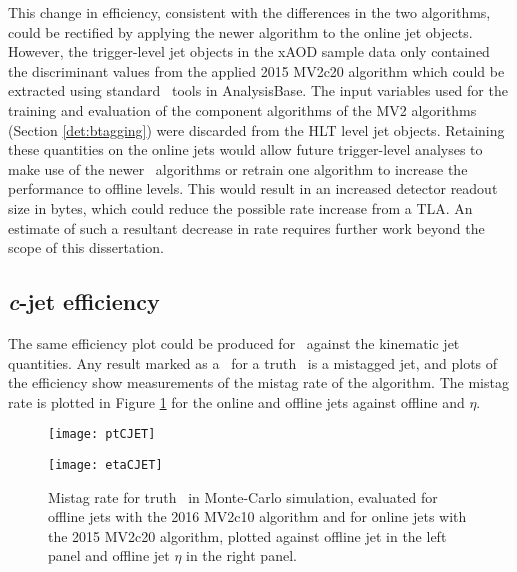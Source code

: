 		This change in efficiency, consistent with the differences in the two algorithms, could be rectified by applying the newer algorithm to the online jet objects. However, the trigger-level jet objects in the xAOD sample data only contained the discriminant values from the applied 2015 MV2c20 algorithm which could be extracted using standard \btag\ tools in AnalysisBase. The input variables used for the training and evaluation of the component algorithms of the MV2 algorithms (Section \ref{det:btagging}) were discarded from the HLT level jet objects. Retaining these quantities on the online jets would allow future trigger-level analyses to make use of the newer \btag\ algorithms or retrain one algorithm to increase the performance to offline levels. This would result in an increased detector readout size in bytes, which could reduce the possible rate increase from a TLA. An estimate of such a resultant decrease in rate requires further work beyond the scope of this dissertation.

	\subsection{\textit{c}-jet efficiency}
	The same efficiency plot could be produced for \cjets\, against the kinematic jet quantities. Any result marked as a \bjet\ for a truth \cjet\ is a mistagged jet, and plots of the efficiency show measurements of the mistag rate of the algorithm. The mistag rate is plotted in Figure \ref{fig:MC:cjetefficiency} for the online and offline jets against offline \pt and $\eta$.
		\begin{figure}[h]
			\centering
			\begin{minipage}[h]{0.48\linewidth}
				\texttt{[image: ptCJET]}

			\end{minipage}
			\quad
			\begin{minipage}[h]{0.48\linewidth}
				\texttt{[image: etaCJET]}
			\end{minipage}
			\caption[Comparison of mistag rate between online and offline truth \cjets\ in Monte-Carlo simulation]{Mistag rate for truth \cjets\ in Monte-Carlo simulation, evaluated for offline jets with the 2016 MV2c10 algorithm and for online jets with the 2015 MV2c20 algorithm, plotted against offline jet \pt in the left panel and offline jet $\eta$ in the right panel.}
			\label{fig:MC:cjetefficiency}
		\end{figure}

